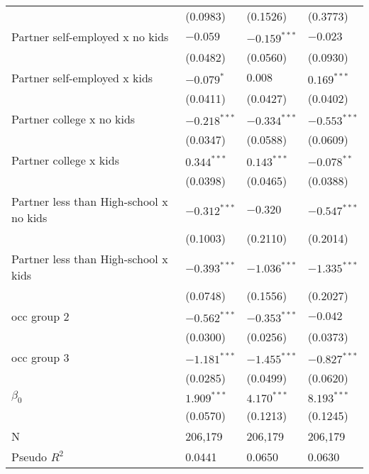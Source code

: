 \begin{tabular}{llll}
                                        &           (0.0983) &           (0.1526) &           (0.3773) \\
Partner self-employed x no kids         &           $-0.059$ &     $-0.159^{***}$ &           $-0.023$ \\
                                        &           (0.0482) &           (0.0560) &           (0.0930) \\
Partner self-employed x kids            &         $-0.079^*$ &            $0.008$ &      $0.169^{***}$ \\
                                        &           (0.0411) &           (0.0427) &           (0.0402) \\
Partner college x no kids               &     $-0.218^{***}$ &     $-0.334^{***}$ &     $-0.553^{***}$ \\
                                        &           (0.0347) &           (0.0588) &           (0.0609) \\
Partner college x kids                  &      $0.344^{***}$ &      $0.143^{***}$ &      $-0.078^{**}$ \\
                                        &           (0.0398) &           (0.0465) &           (0.0388) \\
Partner less than High-school x no kids &     $-0.312^{***}$ &           $-0.320$ &     $-0.547^{***}$ \\
                                        &           (0.1003) &           (0.2110) &           (0.2014) \\
Partner less than High-school x kids    &     $-0.393^{***}$ &     $-1.036^{***}$ &     $-1.335^{***}$ \\
                                        &           (0.0748) &           (0.1556) &           (0.2027) \\
occ group 2                             &     $-0.562^{***}$ &     $-0.353^{***}$ &           $-0.042$ \\
                                        &           (0.0300) &           (0.0256) &           (0.0373) \\
occ group 3                             &     $-1.181^{***}$ &     $-1.455^{***}$ &     $-0.827^{***}$ \\
                                        &           (0.0285) &           (0.0499) &           (0.0620) \\
$\beta_0$                               &      $1.909^{***}$ &      $4.170^{***}$ &      $8.193^{***}$ \\
                                        &           (0.0570) &           (0.1213) &           (0.1245) \\
N                                       &            206,179 &            206,179 &            206,179 \\
Pseudo $R^2$                            &             0.0441 &             0.0650 &             0.0630 \\
\bottomrule
\end{tabular}
